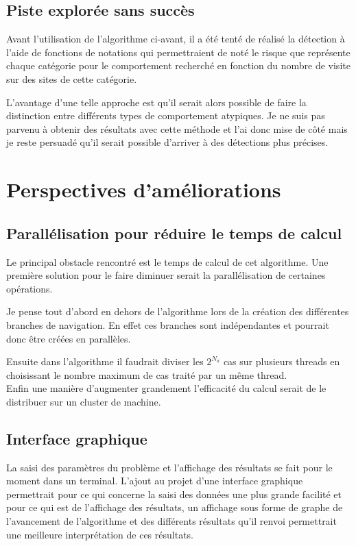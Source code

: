 \documentclass[a4paper, 11pt]{article}
\begin{document}
\subsection{Piste explorée sans succès}

Avant l'utilisation de l'algorithme ci-avant, il a été tenté de réalisé la détection à l'aide de fonctions de notations qui permettraient de noté le risque que représente chaque catégorie pour le comportement recherché en fonction du nombre de visite sur des sites de cette catégorie.

L'avantage d'une telle approche est qu'il serait alors possible de faire la distinction entre différents types de comportement atypiques. Je ne suis pas parvenu à obtenir des résultats avec cette méthode et l'ai donc mise de côté mais je reste persuadé qu'il serait possible d'arriver à des détections plus précises.

\section{Perspectives d'améliorations}
\subsection{Parallélisation pour réduire le temps de calcul}

Le principal obstacle rencontré est le temps de calcul de cet algorithme. Une première solution pour le faire diminuer serait la parallélisation de certaines opérations.

Je pense tout d'abord en dehors de l'algorithme lors de la création des différentes branches de navigation. En effet ces branches sont indépendantes et pourrait donc être créées en parallèles.

Ensuite dans l'algorithme il faudrait diviser les $2^{N_a}$ cas sur plusieurs threads en choisissant le nombre maximum de cas traité par un même thread.\\

Enfin une manière d'augmenter grandement l'efficacité du calcul serait de le distribuer sur un cluster de machine.

\subsection{Interface graphique}

La saisi des paramètres du problème et l'affichage des résultats se fait pour le moment dans un terminal. L'ajout au projet d'une interface graphique permettrait pour ce qui concerne la saisi des données une plus grande facilité et pour ce qui est de l'affichage des résultats, un affichage sous forme de graphe de l'avancement de l'algorithme et des différents résultats qu'il renvoi permettrait une meilleure interprétation de ces résultats.
\end{document}
